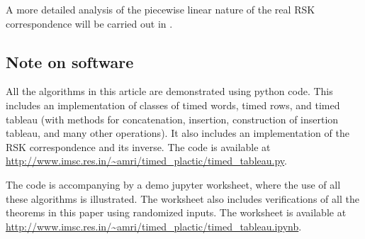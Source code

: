 \documentclass[10pt]{amsproc}
\theoremstyle{definition}
\theoremstyle{remark}
\begin{document}
A more detailed analysis of the piecewise linear nature of the real RSK correspondence will be carried out in \cite{cgp}.
\subsection{Note on software}
\label{sec:software}
All the algorithms in this article are demonstrated using python code.
This includes an implementation of classes of timed words, timed rows, and timed tableau (with methods for concatenation, insertion, construction of insertion tableau, and many other operations).
It also includes an implementation of the RSK correspondence and its inverse.
The code is available at \url{http://www.imsc.res.in/~amri/timed_plactic/timed_tableau.py}.

The code is accompanying by a demo jupyter worksheet, where the use of all these algorithms is illustrated.
The worksheet also includes verifications of all the theorems in this paper using randomized inputs.
The worksheet is available at \url{http://www.imsc.res.in/~amri/timed_plactic/timed_tableau.ipynb}.


\end{document}
